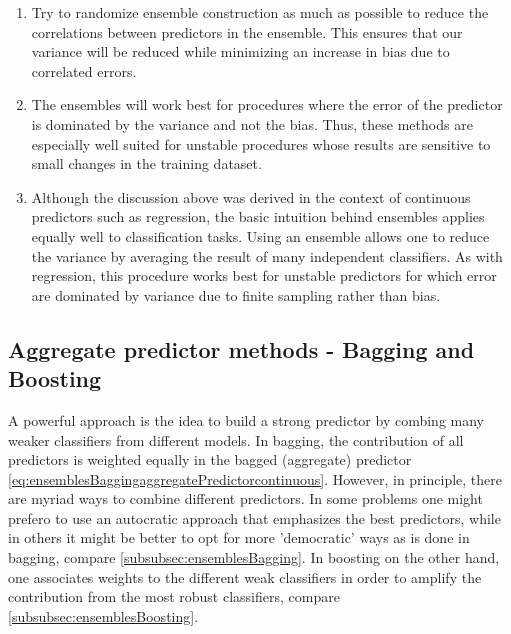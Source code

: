 \begin{enumerate}
	\item Try to randomize ensemble construction as much as possible to reduce the correlations between predictors in the ensemble. This ensures that our variance will be reduced while minimizing an increase in bias due to correlated errors.
	\item The ensembles will work best for procedures where the error of the predictor is dominated by the variance and not the bias. Thus, these methods are especially well suited for unstable procedures whose results are sensitive to small changes in the training dataset.
	\item Although the discussion above was derived in the context of continuous predictors such as regression, the basic intuition behind ensembles applies equally well to classification tasks. Using an ensemble allows one to reduce the variance by averaging the result of many independent classifiers. As with regression, this procedure works best for unstable predictors for which error are dominated by variance due to finite sampling rather than bias.
\end{enumerate}


\subsection{Aggregate predictor methods - Bagging and Boosting}
A powerful approach is the idea to build a strong predictor by combing many weaker classifiers from different models.
In bagging, the contribution of all predictors is weighted equally in the bagged (aggregate) predictor \ref{eq:ensemblesBaggingaggregatePredictorcontinuous}. However, in principle, there are myriad ways to combine different predictors. In some problems one might prefero to use an autocratic approach that emphasizes the best predictors, while in others it might be better to opt for more ’democratic’ ways as is done in bagging, compare \ref{subsubsec:ensemblesBagging}. In boosting on the other hand, one associates weights to the different weak classifiers in order to amplify the contribution from the most robust classifiers, compare \ref{subsubsec:ensemblesBoosting}.
